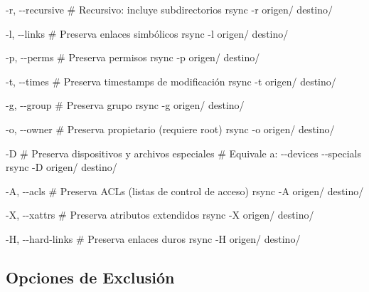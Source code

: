 \documentclass[
  doc,
  floatsintext,
  longtable,
  a4paper,
  nolmodern,
  notxfonts,
  notimes,
  12pt,
  colorlinks=true,linkcolor=blue,citecolor=blue,urlcolor=blue]{apa7}
\newenvironment{Shaded}{\begin{snugshade}}{\end{snugshade}}
\newcommand{\AttributeTok}[1]{\textcolor[rgb]{0.40,0.45,0.13}{#1}}
\newcommand{\CommentTok}[1]{\textcolor[rgb]{0.37,0.37,0.37}{#1}}
\newcommand{\ExtensionTok}[1]{\textcolor[rgb]{0.00,0.23,0.31}{#1}}
\newcommand{\FunctionTok}[1]{\textcolor[rgb]{0.28,0.35,0.67}{#1}}
\newcommand{\NormalTok}[1]{\textcolor[rgb]{0.00,0.23,0.31}{#1}}
\begin{document}
\begin{Shaded}
\begin{Highlighting}[]
\ExtensionTok{{-}r,} \AttributeTok{{-}{-}recursive}
    \CommentTok{\# Recursivo: incluye subdirectorios}
    \FunctionTok{rsync} \AttributeTok{{-}r}\NormalTok{ origen/ destino/}

\ExtensionTok{{-}l,} \AttributeTok{{-}{-}links}
    \CommentTok{\# Preserva enlaces simbólicos}
    \FunctionTok{rsync} \AttributeTok{{-}l}\NormalTok{ origen/ destino/}

\ExtensionTok{{-}p,} \AttributeTok{{-}{-}perms}
    \CommentTok{\# Preserva permisos}
    \FunctionTok{rsync} \AttributeTok{{-}p}\NormalTok{ origen/ destino/}

\ExtensionTok{{-}t,} \AttributeTok{{-}{-}times}
    \CommentTok{\# Preserva timestamps de modificación}
    \FunctionTok{rsync} \AttributeTok{{-}t}\NormalTok{ origen/ destino/}

\ExtensionTok{{-}g,} \AttributeTok{{-}{-}group}
    \CommentTok{\# Preserva grupo}
    \FunctionTok{rsync} \AttributeTok{{-}g}\NormalTok{ origen/ destino/}

\ExtensionTok{{-}o,} \AttributeTok{{-}{-}owner}
    \CommentTok{\# Preserva propietario (requiere root)}
    \FunctionTok{rsync} \AttributeTok{{-}o}\NormalTok{ origen/ destino/}

\ExtensionTok{{-}D}
    \CommentTok{\# Preserva dispositivos y archivos especiales}
    \CommentTok{\# Equivale a: {-}{-}devices {-}{-}specials}
    \FunctionTok{rsync} \AttributeTok{{-}D}\NormalTok{ origen/ destino/}

\ExtensionTok{{-}A,} \AttributeTok{{-}{-}acls}
    \CommentTok{\# Preserva ACLs (listas de control de acceso)}
    \FunctionTok{rsync} \AttributeTok{{-}A}\NormalTok{ origen/ destino/}

\ExtensionTok{{-}X,} \AttributeTok{{-}{-}xattrs}
    \CommentTok{\# Preserva atributos extendidos}
    \FunctionTok{rsync} \AttributeTok{{-}X}\NormalTok{ origen/ destino/}

\ExtensionTok{{-}H,} \AttributeTok{{-}{-}hard{-}links}
    \CommentTok{\# Preserva enlaces duros}
    \FunctionTok{rsync} \AttributeTok{{-}H}\NormalTok{ origen/ destino/}
\end{Highlighting}
\end{Shaded}

\subsection{Opciones de Exclusión}\label{opciones-de-exclusiuxf3n}
\end{document}
